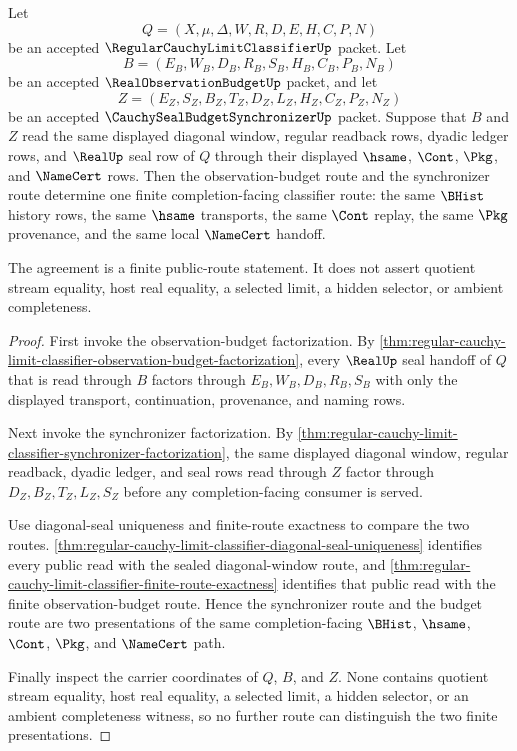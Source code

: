 \begin{theorem}
\label{thm:regular-cauchy-limit-classifier-budget-synchronizer-route-agreement}
Let
$$
Q=(X,\mu,\Delta,W,R,D,E,H,C,P,N)
$$
be an accepted $\RegularCauchyLimitClassifierUp$ packet. Let
$$
B=(E_B,W_B,D_B,R_B,S_B,H_B,C_B,P_B,N_B)
$$
be an accepted $\RealObservationBudgetUp$ packet, and let
$$
Z=(E_Z,S_Z,B_Z,T_Z,D_Z,L_Z,H_Z,C_Z,P_Z,N_Z)
$$
be an accepted $\CauchySealBudgetSynchronizerUp$ packet. Suppose that $B$ and $Z$ read the same displayed diagonal window, regular readback rows, dyadic ledger rows, and $\RealUp$ seal row of $Q$ through their displayed $\hsame$, $\Cont$, $\Pkg$, and $\NameCert$ rows. Then the observation-budget route and the synchronizer route determine one finite completion-facing classifier route: the same $\BHist$ history rows, the same $\hsame$ transports, the same $\Cont$ replay, the same $\Pkg$ provenance, and the same local $\NameCert$ handoff.

The agreement is a finite public-route statement. It does not assert quotient stream equality, host real equality, a selected limit, a hidden selector, or ambient completeness.
\end{theorem}
\begin{proof}
First invoke the observation-budget factorization. By \autoref{thm:regular-cauchy-limit-classifier-observation-budget-factorization}, every $\RealUp$ seal handoff of $Q$ that is read through $B$ factors through $E_B,W_B,D_B,R_B,S_B$ with only the displayed transport, continuation, provenance, and naming rows.

Next invoke the synchronizer factorization. By \autoref{thm:regular-cauchy-limit-classifier-synchronizer-factorization}, the same displayed diagonal window, regular readback, dyadic ledger, and seal rows read through $Z$ factor through $D_Z,B_Z,T_Z,L_Z,S_Z$ before any completion-facing consumer is served.

Use diagonal-seal uniqueness and finite-route exactness to compare the two routes. \autoref{thm:regular-cauchy-limit-classifier-diagonal-seal-uniqueness} identifies every public read with the sealed diagonal-window route, and \autoref{thm:regular-cauchy-limit-classifier-finite-route-exactness} identifies that public read with the finite observation-budget route. Hence the synchronizer route and the budget route are two presentations of the same completion-facing $\BHist$, $\hsame$, $\Cont$, $\Pkg$, and $\NameCert$ path.

Finally inspect the carrier coordinates of $Q$, $B$, and $Z$. None contains quotient stream equality, host real equality, a selected limit, a hidden selector, or an ambient completeness witness, so no further route can distinguish the two finite presentations.
\end{proof}

